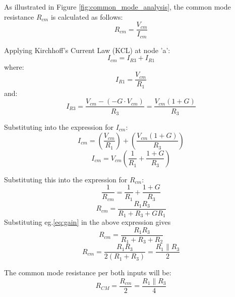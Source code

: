 \begin{itemize}
As illustrated in Figure \ref{fig:common_mode_analysis}, the common mode resistance \(R_{cm}\) is calculated as follows:
\begin{equation}
	R_{cm} = \frac{V_{cm}}{I_{cm}}
	\label{eq:rcm}
\end{equation}

Applying Kirchhoff's Current Law (KCL) at node 'a':
\begin{equation}
	I_{cm} = I_{R3} + I_{R1}
	\label{eq:icm_kcl}
\end{equation}
where:
\begin{equation}
	I_{R1} = \frac{V_{cm}}{R_1}
	\label{eq:ir1_cm}
\end{equation}
and:
\begin{equation}
	I_{R3} = \frac{V_{cm} - (-G \cdot V_{cm})}{R_3} = \frac{V_{cm}(1 + G)}{R_3}
	\label{eq:ir3_cm}
\end{equation}

Substituting into the expression for \(I_{cm}\):
\begin{equation}
	I_{cm} = \left( \frac{V_{cm}}{R_1} \right) + \left( \frac{V_{cm}(1 + G)}{R_3} \right)
	\label{eq:icm}
\end{equation}
\begin{equation}
	I_{cm} = V_{cm} \left( \frac{1}{R_1} + \frac{1 + G}{R_3} \right)
	\label{eq:icm_simplified}
\end{equation}

Substituting this into the expression for \(R_{cm}\):
\begin{equation}
	\frac{1}{R_{cm}} = \frac{1}{R_1} + \frac{1 + G}{R_3}
	\label{eq:rcm_inverse}
\end{equation}
\begin{equation}
	R_{cm} = \frac{R_1 R_3}{R_1 + R_3 + G R_1}
	\label{eq:rcm_final}
\end{equation}
Substituting eg.\ref{eq:gain} in the above expression gives
\begin{equation}
	R_{cm} = \frac{R_1 R_3}{R_1 + R_3 + R_2}
	\label{eq:rcm_r2}
\end{equation}
\begin{equation}
	R_{cm} = \frac{R_1 R_3}{2 (R_1 + R_3)} = \frac{R_1 \parallel R_3}{2}
	\label{eq:rcm_parallel}
\end{equation}

The common mode resistance per both inputs will be:
\begin{equation}
	R_{CM} = \frac{R_{cm}}{2} = \frac{R_1 \parallel R_3}{4}
	\label{eq:rcm_per_input}
\end{equation}


\end{itemize}
